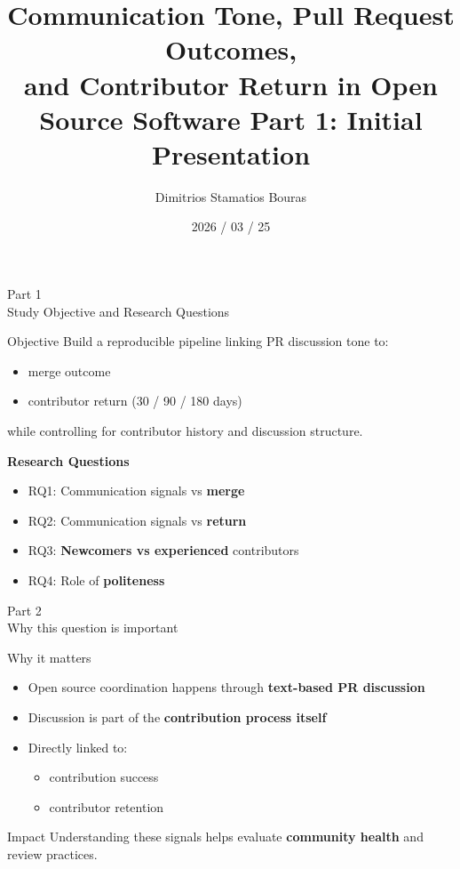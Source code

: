 \documentclass[aspectratio=169,11pt]{beamer}
\title[PR Communication Tone]{Communication Tone, Pull Request Outcomes,\\and Contributor Return in Open Source Software
\newline
Part 1: Initial Presentation}
\author[D.S Bouras]{Dimitrios Stamatios Bouras}
\institute{Quantitative Analysis of Open Source Software
\newline
Student Number: 2501112125}
\date{2026 / 03 / 25}
\begin{document}
\begin{frame}
\titlepage
\end{frame}



\begin{frame}{Part 1\\Study Objective and Research Questions}

\begin{block}{Objective}
Build a reproducible pipeline linking PR discussion tone to:
\begin{itemize}
  \item merge outcome
  \item contributor return (30 / 90 / 180 days)
\end{itemize}
while controlling for contributor history and discussion structure.
\end{block}

\vspace{0.4em}
\textbf{Research Questions}
\begin{itemize}
  \item RQ1: Communication signals vs \textbf{merge}
  \item RQ2: Communication signals vs \textbf{return}
  \item RQ3: \textbf{Newcomers vs experienced} contributors
  \item RQ4: Role of \textbf{politeness}
\end{itemize}

\end{frame}


\begin{frame}{Part 2\\Why this question is important}

\begin{block}{Why it matters}
\begin{itemize}
  \item Open source coordination happens through \textbf{text-based PR discussion}
  \item Discussion is part of the \textbf{contribution process itself}
  \item Directly linked to:
  \begin{itemize}
    \item contribution success
    \item contributor retention
  \end{itemize}
\end{itemize}
\end{block}

\vspace{0.5em}
\begin{alertblock}{Impact}
Understanding these signals helps evaluate \textbf{community health} and review practices.
\end{alertblock}

\end{frame}
\end{document}
